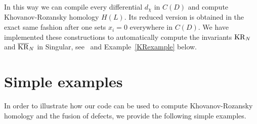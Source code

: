 \documentclass{compositio}
\theoremstyle{definition}
\numberwithin{equation}{section}
\begin{document}
In this way we can compile every differential $d_{\chi}$ in $C(D)$ and compute Khovanov-Rozansky homology $H(L)$. Its reduced version is obtained in the exact same fashion after one sets $x_{i}=0$ everywhere in $C(D)$. We have implemented these constructions to automatically compute the invariants $\operatorname{KR}_{N}$ and $\overline{\operatorname{KR}}_{N}$ in Singular, see~\cite{cmWebCompileCode} and Example~\ref{KRexample} below.

\section{Simple examples}
\label{simpleexamples}

In order to illustrate how our code can be used to compute Khovanov-Rozansky homology and the fusion of defects, we provide the following simple examples. 
\end{document}
